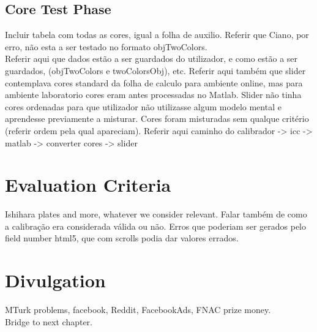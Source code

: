 \subsection{Core Test Phase}
\label{subsec:design_core}
%
Incluir tabela com todas as cores, igual a folha de auxilio. Referir que Ciano, por erro, não esta a ser testado no formato objTwoColors. \\
Referir aqui que dados estão a ser guardados do utilizador, e como estão a ser guardados, (objTwoColors e twoColorsObj), etc.
Referir aqui também que slider contemplava cores standard da folha de calculo para ambiente online,
mas para ambiente laboratorio cores eram antes processadas no Matlab. Slider não tinha cores ordenadas para que utilizador não utilizasse
algum modelo mental e aprendesse previamente a misturar. Cores foram misturadas sem qualque critério (referir ordem pela qual apareciam).
Referir aqui caminho do calibrador -> icc -> matlab -> converter cores -> slider
%
\section{Evaluation Criteria}
\label{sec:impl_evaluationcriteria}
Ishihara plates and more, whatever we consider relevant. Falar também de como a calibração era considerada válida ou não. Erros
que poderiam ser gerados pelo field number html5, que com scrolls podia dar valores errados. \\

\section{Divulgation}
\label{sec:impl_divulgation}
MTurk problems, facebook, Reddit, FacebookAds, FNAC prize money. \\

Bridge to next chapter.
